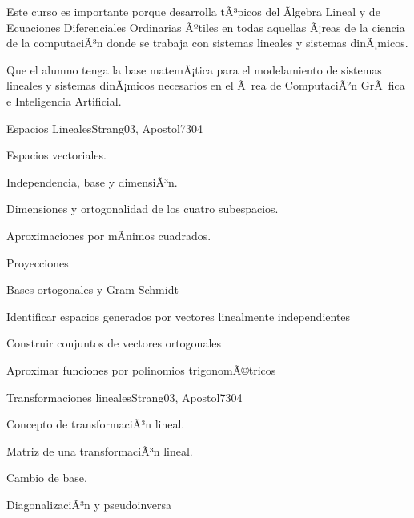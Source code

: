 \begin{syllabus}


\begin{justification}
Este curso es importante porque desarrolla tÃ³picos del Ãlgebra Lineal y de Ecuaciones Diferenciales Ordinarias Ãºtiles en todas aquellas Ã¡reas de la ciencia de la computaciÃ³n donde se trabaja con sistemas lineales y sistemas dinÃ¡micos.
\end{justification}

\begin{goals}
\item Que el alumno tenga la base matemÃ¡tica para el modelamiento de sistemas lineales y sistemas dinÃ¡micos necesarios en el Ã rea de ComputaciÃ²n GrÃ fica e Inteligencia Artificial.
\end{goals}

\begin{outcomes}
\end{outcomes}

\begin{unit}{Espacios Lineales}{Strang03, Apostol73}{0}{4}
\begin{topics}
      \item Espacios vectoriales.
      \item Independencia, base y dimensiÃ³n.
      \item Dimensiones y ortogonalidad de los cuatro subespacios.
      \item Aproximaciones por mÃ­nimos cuadrados.
      \item Proyecciones
      \item Bases ortogonales y Gram-Schmidt
   \end{topics}

   \begin{unitgoals}
      \item Identificar espacios generados por vectores linealmente independientes
      \item Construir conjuntos de vectores ortogonales
      \item Aproximar funciones por polinomios trigonomÃ©tricos
   \end{unitgoals}
\end{unit}

\begin{unit}{Transformaciones lineales}{Strang03, Apostol73}{0}{4}
\begin{topics}
      \item Concepto de transformaciÃ³n lineal.
      \item Matriz de una transformaciÃ³n lineal.
      \item Cambio de base.
      \item DiagonalizaciÃ³n y pseudoinversa
   \end{topics}


\end{unit}
\end{syllabus}
